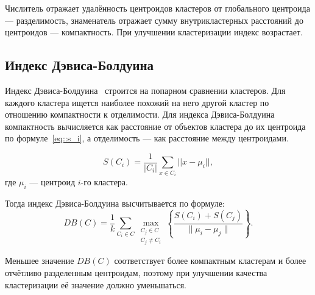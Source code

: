 Числитель отражает удалённость центроидов кластеров от глобального центроида --- разделимость, знаменатель отражает сумму внутрикластерных расстояний до центроидов --- компактность. При улучшении кластеризации индекс возрастает.

\subsection{Индекс Дэвиса-Болдуина}

Индекс Дэвиса-Болдуина~\cite{mark_of_clast} строится на попарном сравнении кластеров. Для каждого кластера ищется наиболее похожий на него другой кластер по отношению компактности к отделимости. Для индекса Дэвиса-Болдуина компактность вычисляется как расстояние от объектов кластера до их центроида по формуле~\ref{eq::s_i}, а отделимость --- как расстояние между центроидами.

\begin{equation}
	S(C_i) = \frac{1}{|C_i|} \sum_{x \in C_i}||x - \mu_i||,
	\label{eq::s_i}
\end{equation}
где $\mu_i$ --- центроид $i$-го кластера.

Тогда индекс Дэвиса-Болдуина высчитывается по формуле:
\begin{equation}
	DB(C) = \frac{1}{k} \sum_{C_i \in C}
	\max_{\substack{C_j \in C \\ C_j \neq C_i}}
	\left\{ \frac{S(C_i) + S(C_j)}{\|\mu_i - \mu_j\|} \right\}.
\end{equation}

Меньшее значение $DB(C)$ соответствует более компактным кластерам и более отчётливо разделенным центроидам, поэтому при улучшении качества кластеризации её значение должно уменьшаться.

